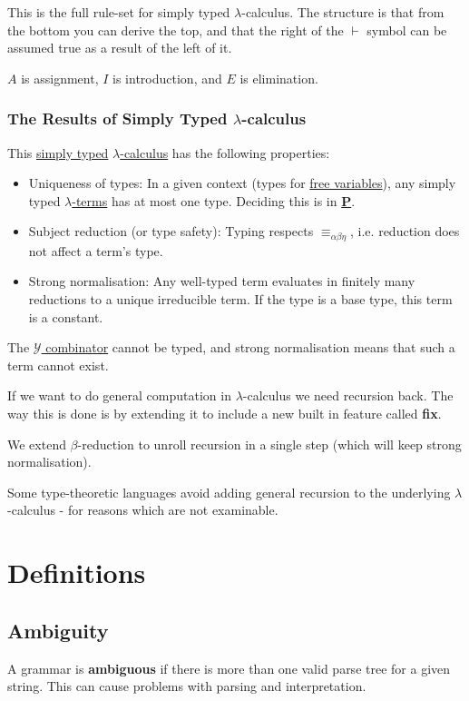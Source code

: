 \documentclass{article}
\begin{document}
This is the full rule-set for simply typed $\lambda$-calculus. The structure is that from the bottom you can derive the top, and that the right of the $\vdash$ symbol can be assumed true as a result of the left of it.

$A$ is assignment, $I$ is introduction, and $E$ is elimination.

\subsubsection{The Results of Simply Typed $\lambda$-calculus}
This \hyperref[types]{simply typed} \hyperref[lambda-calculus]{$\lambda$-calculus} has the following properties:
\begin{itemize}
    \item Uniqueness of types: In a given context (types for \hyperref[free-variables]{free variables}), any simply typed \hyperref[lambda-term]{$\lambda$-terms} has at most one type. Deciding this is in \hyperref[P]{\textbf{P}}.
    \item Subject reduction (or type safety): Typing respects \hyperref[equivalence]{$\equiv_{\alpha\beta\eta}$}, i.e. reduction does not affect a term's type.
    \item Strong normalisation: Any well-typed term evaluates in finitely many reductions to a unique irreducible term. If the type is a base type, this term is a constant.
\end{itemize}

The \hyperref[y-combinator]{$\mathcal{Y}$ combinator} cannot be typed, and strong normalisation means that such a term cannot exist.

If we want to do general computation in $\lambda$-calculus we need recursion back. The way this is done is by extending it to include a new built in feature called \textbf{fix}.

We extend $\beta$-reduction to unroll recursion in a single step (which will keep strong normalisation). 

Some type-theoretic languages avoid adding general recursion to the underlying $\lambda$-calculus - for reasons which are not examinable.

\newpage
\section{Definitions}
\subsection{Ambiguity}\label{ambiguity}
A grammar is \textbf{ambiguous} if there is more than one valid parse tree for a given string. This can cause problems with parsing and interpretation.
\end{document}
